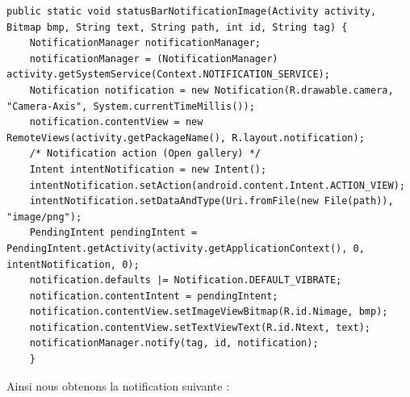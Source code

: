 \begin{changemargin}{0cm}{-2cm}
\begin{lstlisting}[caption={ImageView address resolver}] 
 public static void statusBarNotificationImage(Activity activity, Bitmap bmp, String text, String path, int id, String tag) {
	NotificationManager notificationManager;
	notificationManager = (NotificationManager) activity.getSystemService(Context.NOTIFICATION_SERVICE);
	Notification notification = new Notification(R.drawable.camera,	"Camera-Axis", System.currentTimeMillis());
	notification.contentView = new RemoteViews(activity.getPackageName(), R.layout.notification);
	/* Notification action (Open gallery) */ 
	Intent intentNotification = new Intent();
	intentNotification.setAction(android.content.Intent.ACTION_VIEW);
	intentNotification.setDataAndType(Uri.fromFile(new File(path)), "image/png");
	PendingIntent pendingIntent = PendingIntent.getActivity(activity.getApplicationContext(), 0, intentNotification, 0);
	notification.defaults |= Notification.DEFAULT_VIBRATE;
	notification.contentIntent = pendingIntent;
	notification.contentView.setImageViewBitmap(R.id.Nimage, bmp);
	notification.contentView.setTextViewText(R.id.Ntext, text);
	notificationManager.notify(tag, id, notification);
    }
\end{lstlisting}   
\end{changemargin}
Ainsi nous obtenons la notification suivante : 
